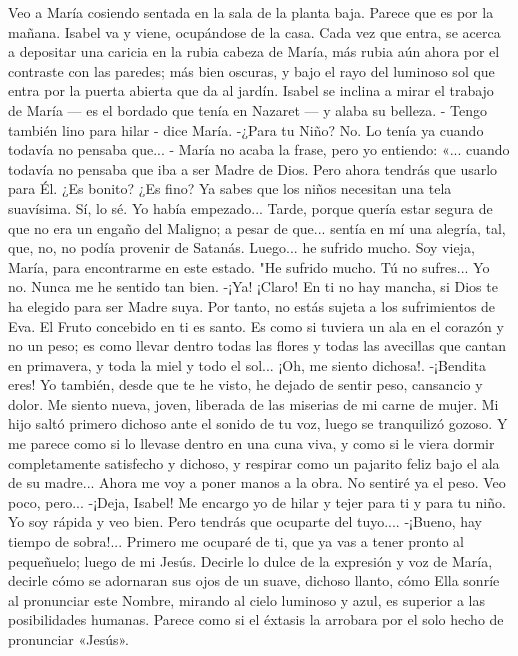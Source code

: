 \documentclass[12pt]{book} %
\begin{document}
Veo a María cosiendo sentada en la sala de la planta baja. Parece que es por la mañana. Isabel va y viene, ocupándose de la casa. Cada vez que entra, se acerca a depositar una caricia en la rubia cabeza de María, más rubia aún ahora por el contraste con las paredes; más bien oscuras, y bajo el rayo del luminoso sol que entra por la puerta abierta que da al jardín. Isabel se inclina a mirar el trabajo de María — es el bordado que tenía en Nazaret — y alaba su belleza. - Tengo también lino para hilar - dice María. 
-¿Para tu Niño? 
No. Lo tenía ya cuando todavía no pensaba que... - María no acaba la frase, pero yo entiendo: «... cuando todavía no 
pensaba que iba a ser Madre de Dios. 
Pero ahora tendrás que usarlo para Él. ¿Es bonito? ¿Es fino? Ya sabes que los niños necesitan una tela suavísima. 
Sí, lo sé. 
Yo había empezado... Tarde, porque quería estar segura de que no era un engaño del Maligno; a pesar de que... sentía 
en mí una alegría, tal, que, no, no podía provenir de Satanás. Luego... he sufrido mucho. Soy vieja, María, para encontrarme en este estado. "He sufrido mucho. Tú no sufres... 
Yo no. Nunca me he sentido tan bien. 
-¡Ya! ¡Claro! En ti no hay mancha, si Dios te ha elegido para ser Madre suya. Por tanto, no estás sujeta a los sufrimientos 
de Eva. El Fruto concebido en ti es santo. 
Es como si tuviera un ala en el corazón y no un peso; es como llevar dentro todas las flores y todas las avecillas que 
cantan en primavera, y toda la miel y todo el sol... ¡Oh, me siento dichosa!. 
-¡Bendita eres! Yo también, desde que te he visto, he dejado de sentir peso, cansancio y dolor. Me siento nueva, joven, liberada de las miserias de mi carne de mujer. Mi hijo saltó primero dichoso ante el sonido de tu voz, luego se tranquilizó gozoso. Y me parece como si lo llevase dentro en una cuna viva, y como si le viera dormir completamente satisfecho y dichoso, y respirar como un pajarito feliz bajo el ala de su madre... Ahora me voy a poner manos a la obra. No sentiré ya el peso. Veo poco, pero... 
-¡Deja, Isabel! Me encargo yo de hilar y tejer para ti y para tu niño. Yo soy rápida y veo bien. 
Pero tendrás que ocuparte del tuyo.... 
-¡Bueno, hay tiempo de sobra!... Primero me ocuparé de ti, que ya vas a tener pronto al pequeñuelo; luego de mi Jesús. 
Decirle lo dulce de la expresión y voz de María, decirle cómo se adornaran sus ojos  de un suave, dichoso llanto, cómo Ella sonríe al pronunciar este Nombre, mirando al cielo luminoso y azul, es superior a las posibilidades humanas. Parece como si el éxtasis la arrobara por el solo hecho de pronunciar «Jesús». 
\end{document}
